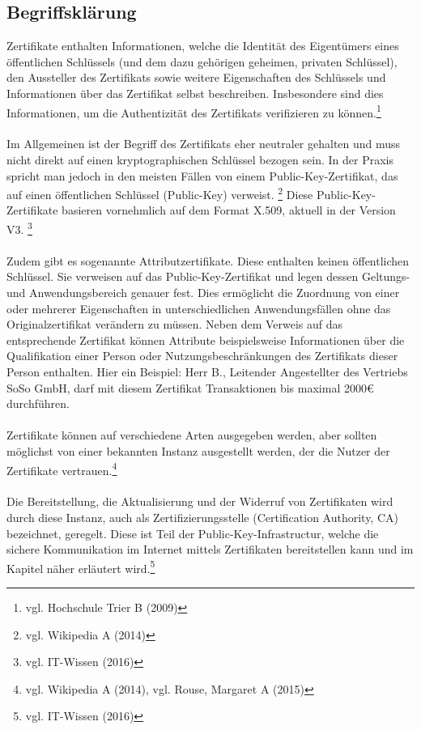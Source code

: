 \subsection{Begriffsklärung}
Zertifikate enthalten Informationen, welche die Identität des Eigentümers eines öffentlichen Schlüssels (und dem dazu gehörigen geheimen, privaten Schlüssel), den Aussteller des Zertifikats sowie weitere Eigenschaften des Schlüssels und Informationen über das Zertifikat selbst beschreiben. Insbesondere sind dies Informationen, um die Authentizität des Zertifikats verifizieren zu können.\footnote{vgl. Hochschule Trier B (2009)}\\
\\
Im Allgemeinen ist der Begriff des Zertifikats eher neutraler gehalten und muss nicht direkt auf einen kryptographischen Schlüssel bezogen sein. In der Praxis spricht man jedoch in den meisten Fällen von einem Public-Key-Zertifikat, das auf einen öffentlichen Schlüssel (Public-Key) verweist. \footnote{vgl. Wikipedia A (2014)} Diese Public-Key-Zertifikate basieren vornehmlich auf dem Format X.509, aktuell in der Version V3. \footnote{vgl. IT-Wissen (2016)}\\
\\
Zudem gibt es sogenannte Attributzertifikate. Diese enthalten keinen öffentlichen Schlüssel. Sie verweisen auf das Public-Key-Zertifikat und legen dessen Geltungs- und Anwendungsbereich genauer fest. Dies ermöglicht die Zuordnung von einer oder mehrerer Eigenschaften in unterschiedlichen Anwendungsfällen ohne das Originalzertifikat verändern zu müssen. Neben dem Verweis auf das entsprechende Zertifikat können Attribute beispielsweise Informationen über die Qualifikation einer Person oder Nutzungsbeschränkungen des Zertifikats dieser Person enthalten. Hier ein Beispiel: Herr B., Leitender Angestellter des Vertriebs SoSo GmbH, darf mit diesem Zertifikat Transaktionen bis maximal 2000€ durchführen.\\ 
\\
Zertifikate können auf verschiedene Arten ausgegeben werden, aber sollten möglichst von einer bekannten Instanz ausgestellt werden, der die Nutzer der Zertifikate vertrauen.\footnote{vgl. Wikipedia A (2014), vgl. Rouse, Margaret A (2015)}\\
\\
Die Bereitstellung, die Aktualisierung und der Widerruf von Zertifikaten wird durch diese Instanz, auch als Zertifizierungsstelle (Certification Authority, CA) bezeichnet, geregelt. Diese ist Teil der Public-Key-Infrastructur, welche die sichere Kommunikation im Internet mittels Zertifikaten bereitstellen kann und im Kapitel \textit{} näher erläutert wird.\footnote{vgl. IT-Wissen (2016)}
